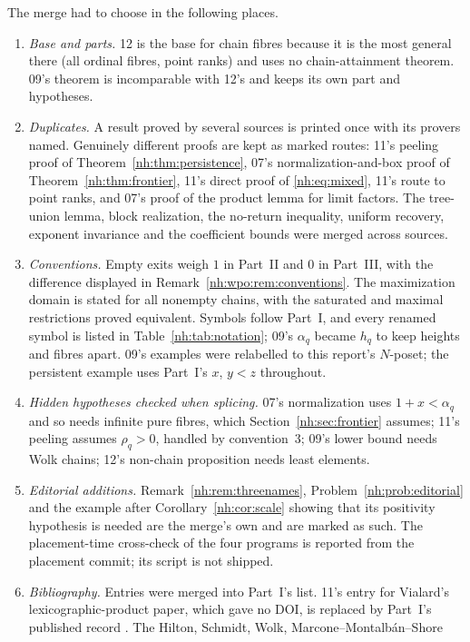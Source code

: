 \documentclass[11pt,a4paper]{article}
\theoremstyle{definition}
\theoremstyle{remark}
\begin{document}
The merge had to choose in the following places.
\begin{enumerate}
\item \emph{Base and parts.} 12 is the base for chain fibres because it is the most
general there (all ordinal fibres, point ranks) and uses no chain-attainment theorem.
09's theorem is incomparable with 12's and keeps its own part and hypotheses.
\item \emph{Duplicates.} A result proved by several sources is printed once with its
provers named. Genuinely different proofs are kept as marked routes: 11's peeling
proof of Theorem~\ref{nh:thm:persistence}, 07's normalization-and-box proof of
Theorem~\ref{nh:thm:frontier}, 11's direct proof of \eqref{nh:eq:mixed}, 11's route to
point ranks, and 07's proof of the product lemma for limit factors. The tree-union
lemma, block realization, the no-return inequality, uniform recovery, exponent
invariance and the coefficient bounds were merged across sources.
\item \emph{Conventions.} Empty exits weigh $1$ in Part~II and $0$ in Part~III, with
the difference displayed in Remark~\ref{nh:wpo:rem:conventions}. The maximization
domain is stated for all nonempty chains, with the saturated and maximal restrictions
proved equivalent. Symbols follow Part~I, and every renamed symbol is listed in
Table~\ref{nh:tab:notation}; 09's $\alpha_q$ became $h_q$ to keep heights and fibres
apart. 09's examples were relabelled to this report's $N$-poset; the persistent
example uses Part~I's $x$, $y<z$ throughout.
\item \emph{Hidden hypotheses checked when splicing.} 07's normalization uses
$1+x<\alpha_q$ and so needs infinite pure fibres, which Section~\ref{nh:sec:frontier}
assumes; 11's peeling assumes $\rho_q>0$, handled by convention~3; 09's lower bound
needs Wolk chains; 12's non-chain proposition needs least elements.
\item \emph{Editorial additions.} Remark~\ref{nh:rem:threenames},
Problem~\ref{nh:prob:editorial} and the example after
Corollary~\ref{nh:cor:scale} showing that its positivity hypothesis is needed
are the merge's own and are marked as such. The
placement-time cross-check of the four programs is reported from the placement commit;
its script is not shipped.
\item \emph{Bibliography.} Entries were merged into Part~I's list. 11's entry for
Vialard's lexicographic-product paper, which gave no DOI, is replaced by Part~I's
published record \cite{Vialard2025}. The Hilton, Schmidt, Wolk, Marcone--Montalb\'an--Shore

\end{enumerate}
\end{document}
